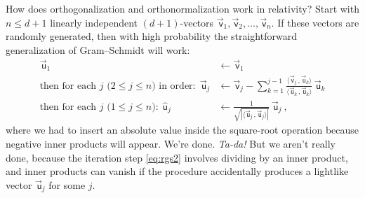 \documentclass{article}
\newcommand\upvec[1]{\!\vec{\,\mathrm{#1}}}
\newcommand{\Lvec}[1]{\upvec{\mathsf{#1}}} %
\newcommand{\Lhat}[1]{\hat{\mathsf{#1}}} %
\newcommand{\inner}[2]{\langle{#1}\,,{#2}\rangle}
\newcommand{\plus}{\!+\!} %
\begin{document}
How does orthogonalization and orthonormalization work in relativity?
Start with $n\leq d+1$ linearly independent $(d\plus1)$-vectors $\Lvec{v}_1,\Lvec{v}_2,\ldots,\Lvec{v}_n$.
If these vectors are randomly generated, then with high probability the straightforward generalization of Gram--Schmidt will work:
\begin{align}
    \Lvec{u}_1 &\leftarrow \Lvec{v}_1 \label{eq:rgs1}
    \\
    \mbox{then for each $j$ ($2\leq j\leq n$) in order:} ~~ \Lvec{u}_j &\leftarrow \Lvec{v}_j - \sum_{k=1}^{j-1} \frac{\inner{\Lvec{v}_j}{\Lvec{u}_k}}{\inner{\Lvec{u}_k}{\Lvec{u}_k}}\,\Lvec{u}_k \label{eq:rgs2}
    \\
    \mbox{then for each $j$ ($1\leq j\leq n$):} ~~ \Lhat{u}_j &\leftarrow \frac{1}{\sqrt{|\inner{\Lvec{u}_j}{\Lvec{u}_j}|}}\,\Lvec{u}_j ~, \label{eq:rgs3}
\end{align}
where we had to insert an absolute value inside the square-root operation because negative inner products will appear.
We're done. \emph{Ta-da!}
But we aren't really done, because the iteration step \eqref{eq:rgs2} involves dividing by an inner product, and inner products can vanish if the procedure accidentally produces a lightlike vector $\Lvec{u}_j$ for some $j$.
\end{document}
